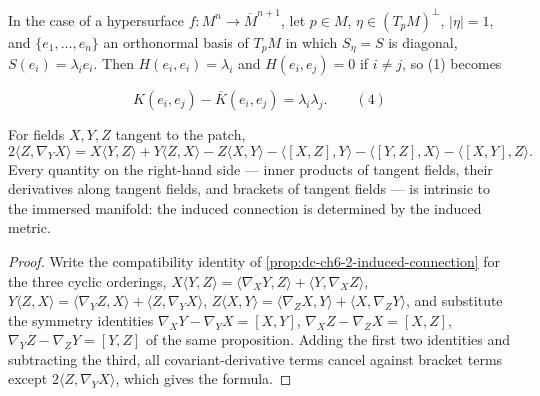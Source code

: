 \begin{remark}
  \label{rem:dc-ch6-2-6}
  \leanok
  In the case of a hypersurface $f:M^n\to\overline{M}^{n+1}$, let $p\in M$,
  $\eta\in(T_pM)^\perp$, $|\eta|=1$, and $\{e_1,\dots,e_n\}$ an orthonormal basis of $T_pM$ in
  which $S_\eta=S$ is diagonal, $S(e_i)=\lambda_ie_i$. Then $H(e_i,e_i)=\lambda_i$
  and $H(e_i,e_j)=0$ if $i\neq j$, so (1) becomes
  
  $$
  K(e_i,e_j)-\overline{K}(e_i,e_j)=\lambda_i\lambda_j.\qquad(4)
  $$
\end{remark}

\begin{lemma}
  \label{lem:dc-ch6-2-7-koszul}
  \leanok
  For fields $X,Y,Z$ tangent to the patch,
  $$
  2\langle Z,\nabla_YX\rangle
    = X\langle Y,Z\rangle + Y\langle Z,X\rangle - Z\langle X,Y\rangle
      - \langle[X,Z],Y\rangle - \langle[Y,Z],X\rangle - \langle[X,Y],Z\rangle.
  $$
  Every quantity on the right-hand side — inner products of tangent fields,
  their derivatives along tangent fields, and brackets of tangent fields — is
  intrinsic to the immersed manifold: the induced connection is determined by
  the induced metric.
\end{lemma}
\begin{proof}
  \leanok
  \sketch
  Write the compatibility identity of \cref{prop:dc-ch6-2-induced-connection}
  for the three cyclic orderings,
  $X\langle Y,Z\rangle=\langle\nabla_XY,Z\rangle+\langle Y,\nabla_XZ\rangle$,
  $Y\langle Z,X\rangle=\langle\nabla_YZ,X\rangle+\langle Z,\nabla_YX\rangle$,
  $Z\langle X,Y\rangle=\langle\nabla_ZX,Y\rangle+\langle X,\nabla_ZY\rangle$,
  and substitute the symmetry identities
  $\nabla_XY-\nabla_YX=[X,Y]$, $\nabla_XZ-\nabla_ZX=[X,Z]$,
  $\nabla_YZ-\nabla_ZY=[Y,Z]$ of the same proposition. Adding the first two
  identities and subtracting the third, all covariant-derivative terms cancel
  against bracket terms except $2\langle Z,\nabla_YX\rangle$, which gives the
  formula.
\end{proof}

